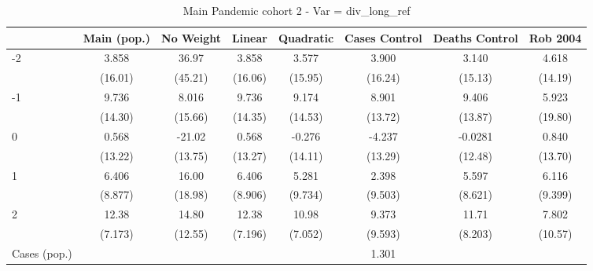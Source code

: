 \documentclass{article}
\begin{document}
{
\def\sym#1{\ifmmode^{#1}\else\(^{#1}\)\fi}
\begin{longtable}{l*{7}{c}}
\caption{Main Pandemic cohort 2 - Var = div\_long\_ref}\\
\hline\hline\endfirsthead\hline\endhead\hline\endfoot\endlastfoot
                &\multicolumn{1}{c}{Main (pop.)}&\multicolumn{1}{c}{No Weight}&\multicolumn{1}{c}{Linear}&\multicolumn{1}{c}{Quadratic}&\multicolumn{1}{c}{Cases Control}&\multicolumn{1}{c}{Deaths Control}&\multicolumn{1}{c}{Rob 2004}\\
\hline
-2              &    3.858         &    36.97         &    3.858         &    3.577         &    3.900         &    3.140         &    4.618         \\
                &  (16.01)         &  (45.21)         &  (16.06)         &  (15.95)         &  (16.24)         &  (15.13)         &  (14.19)         \\
-1              &    9.736         &    8.016         &    9.736         &    9.174         &    8.901         &    9.406         &    5.923         \\
                &  (14.30)         &  (15.66)         &  (14.35)         &  (14.53)         &  (13.72)         &  (13.87)         &  (19.80)         \\
0               &    0.568         &   -21.02         &    0.568         &   -0.276         &   -4.237         &  -0.0281         &    0.840         \\
                &  (13.22)         &  (13.75)         &  (13.27)         &  (14.11)         &  (13.29)         &  (12.48)         &  (13.70)         \\
1               &    6.406         &    16.00         &    6.406         &    5.281         &    2.398         &    5.597         &    6.116         \\
                &  (8.877)         &  (18.98)         &  (8.906)         &  (9.734)         &  (9.503)         &  (8.621)         &  (9.399)         \\
2               &    12.38         &    14.80         &    12.38         &    10.98         &    9.373         &    11.71         &    7.802         \\
                &  (7.173)         &  (12.55)         &  (7.196)         &  (7.052)         &  (9.593)         &  (8.203)         &  (10.57)         \\
Cases (pop.)    &                  &                  &                  &                  &    1.301         &                  &                  \\

\end{longtable}}
\end{document}
